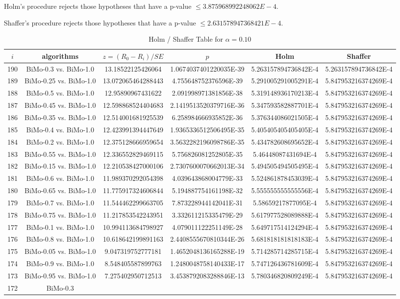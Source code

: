 \documentclass[a4paper,10pt]{article}
\begin{document}
\begin{landscape}
Holm's procedure rejects those hypotheses that have a p-value $\le3.875968992248062E-4$.


Shaffer's procedure rejects those hypotheses that have a p-value $\le2.631578947368421E-4$.


\begin{table}[!htp]
\centering\tiny
\caption{Holm / Shaffer Table for $\alpha=0.10$}
\begin{tabular}{cccccc}
$i$&algorithms&$z=(R_0 - R_i)/SE$&$p$&Holm&Shaffer\\
\hline
190&BiMo-0.3 vs. BiMo-1.0&13.18522125426064&1.0674037401220035E-39&5.263157894736842E-4&5.263157894736842E-4\\189&BiMo-0.25 vs. BiMo-1.0&13.072065464288443&4.755648752376596E-39&5.291005291005291E-4&5.847953216374269E-4\\188&BiMo-0.5 vs. BiMo-1.0&12.95890967431622&2.091998971381856E-38&5.319148936170213E-4&5.847953216374269E-4\\187&BiMo-0.45 vs. BiMo-1.0&12.598868524404683&2.1419513520379716E-36&5.347593582887701E-4&5.847953216374269E-4\\186&BiMo-0.35 vs. BiMo-1.0&12.514001681925539&6.258984666935852E-36&5.376344086021505E-4&5.847953216374269E-4\\185&BiMo-0.4 vs. BiMo-1.0&12.423991394447649&1.9365336512506495E-35&5.405405405405405E-4&5.847953216374269E-4\\184&BiMo-0.2 vs. BiMo-1.0&12.375128666959654&3.5632282196098786E-35&5.434782608695652E-4&5.847953216374269E-4\\183&BiMo-0.55 vs. BiMo-1.0&12.336552829469115&5.756826081252805E-35&5.46448087431694E-4&5.847953216374269E-4\\182&BiMo-0.15 vs. BiMo-1.0&12.210538427000106&2.7307600070662013E-34&5.494505494505495E-4&5.847953216374269E-4\\181&BiMo-0.6 vs. BiMo-1.0&11.989370292054398&4.039643868004779E-33&5.524861878453039E-4&5.847953216374269E-4\\180&BiMo-0.65 vs. BiMo-1.0&11.775917324606844&5.194887754161198E-32&5.555555555555556E-4&5.847953216374269E-4\\179&BiMo-0.7 vs. BiMo-1.0&11.544462299663705&7.873228944142041E-31&5.58659217877095E-4&5.847953216374269E-4\\178&BiMo-0.75 vs. BiMo-1.0&11.217853542243951&3.332611215335479E-29&5.617977528089888E-4&5.847953216374269E-4\\177&BiMo-0.1 vs. BiMo-1.0&10.994113684798927&4.079011122251149E-28&5.649717514124294E-4&5.847953216374269E-4\\176&BiMo-0.8 vs. BiMo-1.0&10.618642199891163&2.4408555670810344E-26&5.681818181818183E-4&5.847953216374269E-4\\175&BiMo-0.05 vs. BiMo-1.0&9.047319752777181&1.4652048136165288E-19&5.714285714285715E-4&5.847953216374269E-4\\174&BiMo-0.9 vs. BiMo-1.0&8.548405587899763&1.2480048758140433E-17&5.747126436781609E-4&5.847953216374269E-4\\173&BiMo-0.95 vs. BiMo-1.0&7.275402950712513&3.4538792083288846E-13&5.780346820809249E-4&5.847953216374269E-4\\172&BiMo-0.3 
\end{tabular}
\end{table}
\end{landscape}
\end{document}
